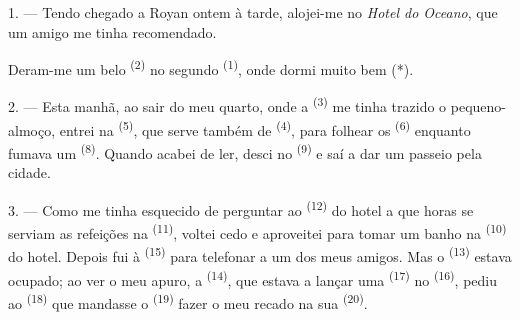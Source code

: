 %
%


\VUsaut{3.0mm}
\VUsaut{1.6mm}
\VUsaut{2.0mm}
\VUsaut{3.4mm}

1. --- Tendo chegado a Royan ontem à tarde, alojei-me no \textit{Hotel do
Oceano}, que um amigo me tinha recomendado.

Deram-me um belo  \textsuperscript{(2)} no segundo 
\textsuperscript{(1)}, onde dormi muito bem (*).

2. --- Esta manhã, ao sair do meu quarto, onde a 
\textsuperscript{(3)} me tinha trazido o pequeno-almoço, entrei na  \textsuperscript{(5)}, que serve também de 
\textsuperscript{(4)}, para folhear os  \textsuperscript{(6)} enquanto
fumava um  \textsuperscript{(8)}. Quando acabei de ler, desci no
 \textsuperscript{(9)} e saí a dar um passeio pela cidade.

3. --- Como me tinha esquecido de perguntar ao 
\textsuperscript{(12)} do hotel a que horas se serviam as refeições na
 \textsuperscript{(11)}, voltei cedo e aproveitei para tomar
um banho na  \textsuperscript{(10)} do hotel. Depois fui à
 \textsuperscript{(15)} para telefonar a um dos meus amigos. Mas o
 \textsuperscript{(13)} estava ocupado; ao ver o meu apuro, a
 \textsuperscript{(14)}, que estava a lançar uma 
\textsuperscript{(17)} no  \textsuperscript{(16)}, pediu ao
 \textsuperscript{(18)} que mandasse o 
\textsuperscript{(19)} fazer o meu recado na sua 
\textsuperscript{(20)}.

